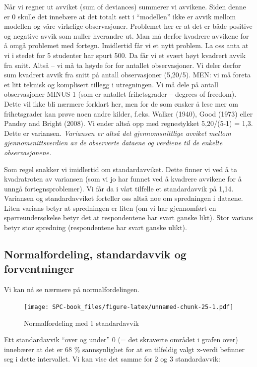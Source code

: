 \documentclass[
]{book}
\begin{document}
Når vi regner ut avviket (sum of deviances) summerer vi avvikene. Siden denne er 0 skulle det innebære at det totalt sett i ``modellen'' ikke er avvik mellom modellen og våre virkelige observasjoner. Problemet her er at det er både positive og negative avvik som nuller hverandre ut. Man må derfor kvadrere avvikene for å omgå problemet med fortegn. Imidlertid får vi et nytt problem. La oss anta at vi i stedet for 5 studenter har spurt 500. Da får vi et svært høyt kvadrert avvik fra snitt. Altså -- vi må ta høyde for for antallet observasjoner. Vi deler derfor sum kvadrert avvik fra snitt på antall observasjoner (5,20/5). MEN: vi må foreta et litt teknisk og komplisert tillegg i utregningen. Vi må dele på antall observasjoner MINUS 1 (som er antallet frihetsgrader -- degrees of freedom). Dette vil ikke bli nærmere forklart her, men for de som ønsker å lese mer om frihetsgrader kan prøve noen andre kilder, f.eks. Walker (1940), Good (1973) eller Pandey and Bright (2008). Vi ender altså opp med regnestykket 5,20/(5-1) = 1,3. Dette er variansen. \emph{Variansen er altså det gjennomsnittlige avviket mellom gjennomsnittsverdien av de observerte dataene og verdiene til de enkelte observasjonene.}

Som regel snakker vi imidlertid om standardavviket. Dette finner vi ved å ta kvadratroten av variansen (som vi jo har funnet ved å kvadrere avvikene for å unngå fortegnsproblemer). Vi får da i vårt tilfelle et standardavvik på 1,14. Variansen og standardavviket forteller oss altså noe om spredningen i dataene. Liten varians betyr at spredningen er liten (om vi har gjennomført en spørreundersøkelse betyr det at respondentene har svart ganske likt). Stor varians betyr stor spredning (respondentene har svart ganske ulikt).

\hypertarget{normalfordeling-standardavvik-og-forventninger}{%
\subsection{Normalfordeling, standardavvik og forventninger}\label{normalfordeling-standardavvik-og-forventninger}}

Vi kan nå se nærmere på normalfordelingen.

\begin{figure}
\centering
\texttt{[image: SPC-book\_files/figure-latex/unnamed-chunk-25-1.pdf]}
\caption{\label{fig:unnamed-chunk-25}Normalfordeling med 1 standardavvik}
\end{figure}

Ett standardavvik ``over og under'' 0 (= det skraverte området i grafen over) innebærer at det er 68 \% sannsynlighet for at en tilfeldig valgt x-verdi befinner seg i dette intervallet. Vi kan vise det samme for 2 og 3 standardavvik:
\end{document}
